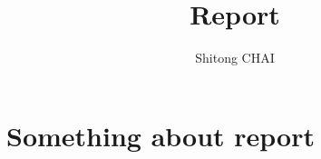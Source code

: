 \documentclass[a4paper,12pt]{report}
\title{Report}
\date{}
\author{Shitong CHAI}
\begin{document}
\maketitle
\tableofcontents

\chapter {Something about report\cite{Nobody06}}



{}

\end{document}
